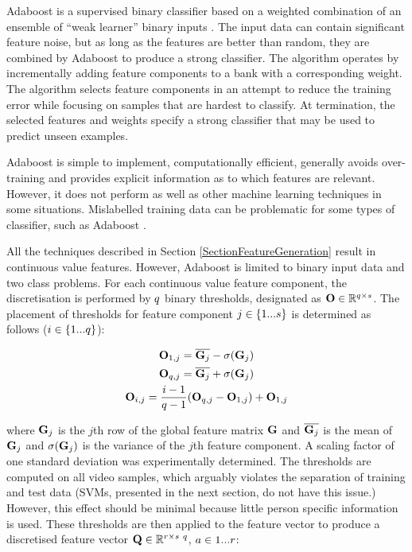 Adaboost is a supervised binary classifier based on a weighted combination of an ensemble of ``weak learner'' binary inputs \cite{Freund1996}. The input data can contain significant feature noise, but as long as the features are better than random, they are combined by Adaboost to produce a strong classifier. The algorithm operates by incrementally adding feature components to a bank with a corresponding weight. The algorithm selects feature components in an attempt to reduce the training error while focusing on samples that are hardest to classify. At termination, the selected features and weights specify a strong classifier that may be used to predict unseen examples. 

Adaboost is simple to implement, computationally efficient, generally avoids over-training and provides explicit information as to which features are relevant. However, it does not perform as well as other machine learning techniques in some situations. Mislabelled training data can be problematic for some types of classifier, such as Adaboost \cite{Natsuki2008}.

All the \featureGeneration techniques described in Section \ref{SectionFeatureGeneration} result in continuous value features. However, Adaboost is limited to binary input data and two class problems. 
For each continuous value feature component, the discretisation is performed by $q$ binary thresholds, designated as $\textbf{O} \in \mathbb{R}^{q \times s}$. The placement of thresholds for feature component $j  \in \{1...s\}$ is determined as follows ($i \in \{1...q\}$):

\begin{gather}
\textbf{O}_{1,j} = \overline{\textbf{G}_j} - \sigma(\textbf{G}_j) \\
\textbf{O}_{q,j} = \overline{\textbf{G}_j} + \sigma(\textbf{G}_j) \\
\textbf{O}_{i,j} = \frac{i-1}{q-1}(\textbf{O}_{q,j} - \textbf{O}_{1,j}) + \textbf{O}_{1,j}
\end{gather}

where $\textbf{G}_j$ is the $j$th row of the global feature matrix $\textbf{G}$ and $\overline{\textbf{G}_j}$ is the mean of $\textbf{G}_j$ and $\sigma(\textbf{G}_j)$ is the variance of the $j$th feature component. A scaling factor of one standard deviation was experimentally determined. The thresholds are computed on all video samples, which arguably violates the separation of training and test data (\ac{SVM}s, presented in the next section, do not have this issue.) However, this effect should be minimal because little person specific information is used. These thresholds are then applied to the feature vector to produce a discretised feature vector $\textbf{Q} \in \mathbb{R}^{r \times s\ q}$, $a \in {1...r}$:

